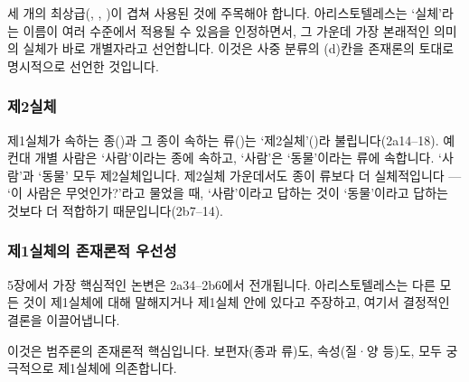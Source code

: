 \documentclass[12pt, a4paper]{article}
\begin{document}

세 개의 최상급(, , )이 겹쳐 사용된 것에 주목해야 합니다. 아리스토텔레스는 `실체'라는 이름이 여러 수준에서 적용될 수 있음을 인정하면서, 그 가운데 가장 본래적인 의미의 실체가 바로 개별자라고 선언합니다. 이것은 사중 분류의 (d)칸을 존재론의 토대로 명시적으로 선언한 것입니다.

\subsubsection{제2실체}

제1실체가 속하는 종()과 그 종이 속하는 류()는 `제2실체'()라 불립니다(2a14--18). 예컨대 개별 사람은 `사람'이라는 종에 속하고, `사람'은 `동물'이라는 류에 속합니다. `사람'과 `동물' 모두 제2실체입니다. 제2실체 가운데서도 종이 류보다 더 실체적입니다 --- `이 사람은 무엇인가?'라고 물었을 때, `사람'이라고 답하는 것이 `동물'이라고 답하는 것보다 더 적합하기 때문입니다(2b7--14).

\subsubsection{제1실체의 존재론적 우선성}

5장에서 가장 핵심적인 논변은 2a34--2b6에서 전개됩니다. 아리스토텔레스는 다른 모든 것이 제1실체에 대해 말해지거나 제1실체 안에 있다고 주장하고, 여기서 결정적인 결론을 이끌어냅니다.


이것은 범주론의 존재론적 핵심입니다. 보편자(종과 류)도, 속성(질·양 등)도, 모두 궁극적으로 제1실체에 의존합니다.
\end{document}
